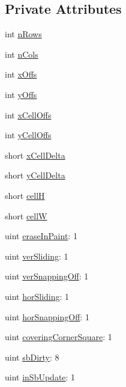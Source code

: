 \subsection*{Private Attributes}
\begin{DoxyCompactItemize}
\item 
int \hyperlink{classQtTableView_abdb28f2e8488304db27f193c266b3e17}{n\+Rows}
\item 
int \hyperlink{classQtTableView_a9f81bc2413bfa7180fb904189172af21}{n\+Cols}
\item 
int \hyperlink{classQtTableView_ad9a6e9303fefd925b8d92822f3930afa}{x\+Offs}
\item 
int \hyperlink{classQtTableView_a2ed1f90a440c78dddcd475bb6e56fe30}{y\+Offs}
\item 
int \hyperlink{classQtTableView_a83a6f60a373bdb2b71328e1e74dff7d9}{x\+Cell\+Offs}
\item 
int \hyperlink{classQtTableView_ad86e5f371dbc42a44aa6df5c95957c58}{y\+Cell\+Offs}
\item 
short \hyperlink{classQtTableView_a6f95c33c17b2a09ab643ff439c31997c}{x\+Cell\+Delta}
\item 
short \hyperlink{classQtTableView_af545e1ce3c1176406d8bd260cc03e207}{y\+Cell\+Delta}
\item 
short \hyperlink{classQtTableView_aff5a36ab7f8770d4b7fa42a5f16ce67d}{cell\+H}
\item 
short \hyperlink{classQtTableView_a89c6ba272703249e1b9ed1966805bbb6}{cell\+W}
\item 
uint \hyperlink{classQtTableView_aa23f1d1770666cfba4c9dcc3496d4030}{erase\+In\+Paint}\+: 1
\item 
uint \hyperlink{classQtTableView_a38d4c817c3cd984937984fc408c1ed49}{ver\+Sliding}\+: 1
\item 
uint \hyperlink{classQtTableView_a3ddcc6656b6529d18cee324790c18d30}{ver\+Snapping\+Off}\+: 1
\item 
uint \hyperlink{classQtTableView_a68c9bdbacec38782c4a05ef264e8cbed}{hor\+Sliding}\+: 1
\item 
uint \hyperlink{classQtTableView_a53b952eecaad103da16c21d5256120a2}{hor\+Snapping\+Off}\+: 1
\item 
uint \hyperlink{classQtTableView_af921747f43ca21feb16045c66b393da6}{covering\+Corner\+Square}\+: 1
\item 
uint \hyperlink{classQtTableView_ae0b61b8debb05420d1d35db35fb1e396}{sb\+Dirty}\+: 8
\item 
uint \hyperlink{classQtTableView_a6d07c134a82e03acd902924440fc5f06}{in\+Sb\+Update}\+: 1

\end{DoxyCompactItemize}
